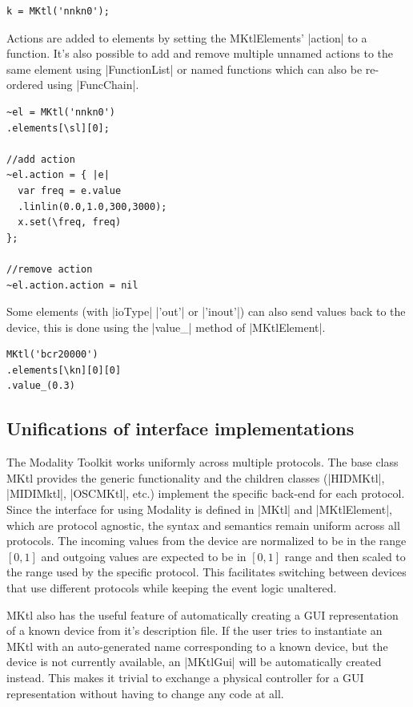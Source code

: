 \documentclass{article}
\begin{document}
\begin{Verbatim}
k = MKtl('nnkn0');
\end{Verbatim}

Actions are added to elements by setting the MKtlElements' |action| to a function.  It's also possible to add and remove multiple unnamed actions to the same element using |FunctionList| or named functions which can also be re-ordered using |FuncChain|.

\begin{Verbatim}
~el = MKtl('nnkn0')
.elements[\sl][0];

//add action
~el.action = { |e|
  var freq = e.value
  .linlin(0.0,1.0,300,3000);
  x.set(\freq, freq)
};

//remove action
~el.action.action = nil
\end{Verbatim}

Some elements (with |ioType| |'out'| or |'inout'|) can also send values back to the device, this is done using the |value_| method of |MKtlElement|.

\begin{Verbatim}	
MKtl('bcr20000')
.elements[\kn][0][0]
.value_(0.3)
\end{Verbatim}

\subsection{Unifications of interface implementations}
\label{sub:unifications_of_interface_implementations}

The Modality Toolkit works uniformly across multiple protocols. The base class MKtl provides the generic functionality and the children classes (|HIDMKtl|, |MIDIMktl|, |OSCMKtl|, etc.) implement the specific back-end for each protocol. Since the interface for using Modality is defined in |MKtl| and |MKtlElement|, which are protocol agnostic, the syntax and semantics remain uniform across all protocols. The incoming values from the device are normalized to be in the range $[0,1]$ and outgoing values are expected to be in $[0,1]$ range and then scaled to the range used by the specific protocol. This facilitates switching between devices that use different protocols while keeping the event logic unaltered.

MKtl also has the useful feature of automatically creating a GUI representation of a known device from it's description file. If the user tries to instantiate an MKtl with an auto-generated name corresponding to a known device, but the device is not currently available, an |MKtlGui| will be automatically created instead. This makes it trivial to exchange a physical controller for a GUI representation without having to change any code at all.
\end{document}
